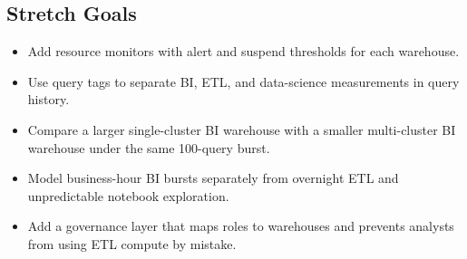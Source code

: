 \subsection*{Stretch Goals}
\begin{itemize}
    \item Add resource monitors with alert and suspend thresholds for each warehouse.
    \item Use query tags to separate BI, ETL, and data-science measurements in query history.
    \item Compare a larger single-cluster BI warehouse with a smaller multi-cluster BI warehouse under the same 100-query burst.
    \item Model business-hour BI bursts separately from overnight ETL and unpredictable notebook exploration.
    \item Add a governance layer that maps roles to warehouses and prevents analysts from using ETL compute by mistake.
\end{itemize}

